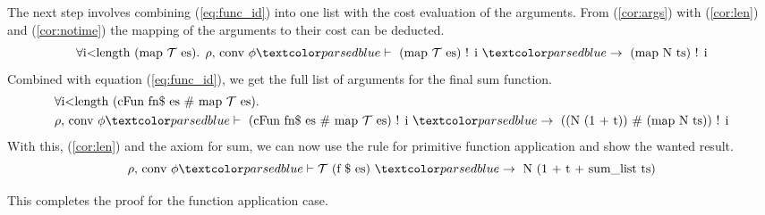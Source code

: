 The next step involves combining (\ref{eq:func_id}) into one list with the cost evaluation of the arguments.
From (\ref{cor:args}) with (\ref{cor:len}) and (\ref{cor:notime}) the mapping of the arguments to their cost can be deducted.
\begin{equation*}
  \forall \text{i<length (map } \mathcal{T}\text{ es). }\rho\text{, conv }\phi \hvdash\text{ (map }\mathcal{T}\text{ es) ! i }\hrightarrow \text{ (map N ts) ! i}
\end{equation*}
Combined with equation (\ref{eq:func_id}), we get the full list of arguments for the final sum function.
\begin{equation*}
  \begin{aligned}
  &\forall \text{i<length (cFun fn\$ es \# map } \mathcal{T}\text{ es). } \\
  &\rho\text{, conv }\phi \hvdash\text{ (cFun fn\$ es \# map }\mathcal{T}\text{ es) ! i }\hrightarrow \text{ ((N (1 + t)) \# (map N ts)) ! i}
  \end{aligned}
\end{equation*}
With this, (\ref{cor:len}) and the axiom for sum, we can now use the rule for primitive function application and show the wanted result.
\begin{equation*}
  \rho \text{, conv } \phi \hvdash \mathcal{T}\text{ (f \$ es) }\hrightarrow\text{ N (1 + t + sum\_list ts)}
\end{equation*}

This completes the proof for the function application case.
